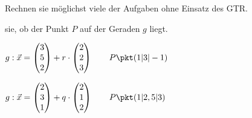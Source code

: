\documentclass[11pt, a5paper, landscape]{scrartcl}
\begin{document}
	\begin{aufgabe}
		Rechnen sie möglichst viele der Aufgaben ohne Einsatz des GTR.
		\begin{multicols}{2}
%
%				
			
			 sie, ob der Punkt $P$ auf der Geraden $g$ liegt.
			\begin{enumeratea}
				\item $g:\vec{x} = \begin{pmatrix} 3 \\ 5 \\ 2 \end{pmatrix} + r\cdot \begin{pmatrix} 2 \\ 2 \\ 3 \end{pmatrix}\qquad P\pkt(1|3|-1)$
				
				\item $g:\vec{x} = \begin{pmatrix} 2 \\ 3 \\ 1 \end{pmatrix} + q\cdot \begin{pmatrix} 2 \\ 1 \\ 2 \end{pmatrix}\qquad P\pkt(1|2,5|3)$
				

\end{enumeratea}
\end{multicols}
\end{aufgabe}
\end{document}
